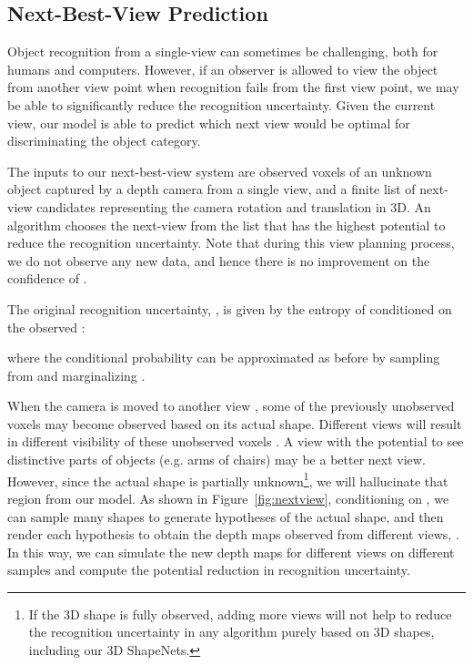 \documentclass[10pt,twocolumn,letterpaper]{article}
\begin{document}
\subsection{Next-Best-View Prediction}





Object recognition from a single-view can sometimes be challenging, both for humans and computers. 
However, if an observer is allowed to view the object from another view point when recognition fails from the first view point, we may be able to significantly reduce the recognition uncertainty. 
Given the current view, our model is able to predict which next view would be optimal for discriminating the object category.


The inputs to our next-best-view system are observed voxels  of an unknown object captured by a depth camera from a single view, and  a finite list of next-view candidates  representing the camera rotation and translation in 3D.
An algorithm chooses the next-view from the list 
that has the highest potential to reduce the recognition uncertainty. 
Note that during this view planning process, we do not observe any new data, and hence there is no improvement on the confidence of . 

The original recognition uncertainty, , is given by the entropy of  conditioned on the observed :

where the conditional probability  can be approximated as before by sampling from  and marginalizing . 



When the camera is moved to another view ,
some of the previously unobserved voxels  may become observed based on its actual shape. 
Different views  will result in different visibility of these unobserved voxels .
A view with the potential to see distinctive parts of objects (e.g. arms of chairs) 
may be a better next view.
However, since the actual shape is partially unknown\footnote{If the 3D shape is fully observed, adding more views will not help to reduce the recognition uncertainty in any algorithm purely based on 3D shapes,
including our 3D ShapeNets.},
we will hallucinate that region from our model.
As shown in Figure~\ref{fig:nextview},
conditioning on ,
we can sample many shapes to generate hypotheses of the actual shape, 
and then render each hypothesis to obtain the depth maps observed from different views, .
In this way, we can simulate the new depth maps for different views on different samples
and compute the potential reduction in recognition uncertainty.
\end{document}
